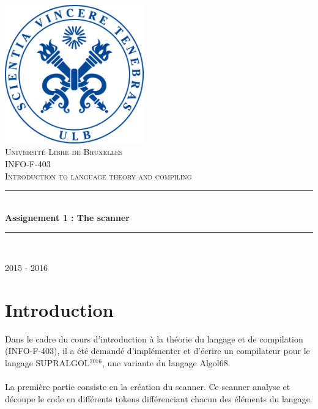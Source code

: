 \documentclass[pdftex,10pt,a4paper]{article}
\newcommand{\HRule}{\rule{\linewidth}{0.5mm}}
\begin{document}
\begin{titlepage}
\begin{center}

\includegraphics[width=0.45\textwidth]{./sceau-a-quadri.jpg}\\[1cm]

\textsc{\LARGE Université Libre de Bruxelles}\\[1.5cm]
\textsc{\Large INFO-F-403\\ Introduction to language theory and compiling}\\[1.5cm]

\HRule \\[0.4cm]
{ \huge \bfseries Assignement 1 : The scanner\\[0.4cm] }

\HRule \\[1.5cm]


\vfill
{\large 2015 - 2016}

\end{center}
\end{titlepage}

\newpage

\section{Introduction}

Dans le cadre du cours d'introduction à la théorie du langage et de compilation (INFO-F-403), il a été demandé d'implémenter et d'écrire un compilateur pour le langage SUPRALGOL$^{2016}$, une variante du langage Algol68.\\\\ La première partie consiste en la création du scanner. Ce scanner analyse et découpe le code en différents tokens différenciant chacun des éléments du langage.
\end{document}
